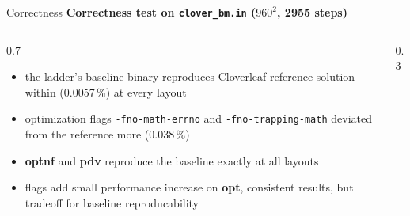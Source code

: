 \documentclass[aspectratio=169,10pt]{beamer}
\begin{document}
\begin{frame}{Correctness}
  \textbf{Correctness test on \texttt{clover\_bm.in} ($960^2$, 2955 steps)}
  \begin{columns}[T]
    \begin{column}{0.7\textwidth}
      \begin{itemize}
        \item the ladder's baseline binary reproduces Cloverleaf reference solution within (0.0057\,\%) at every layout
        \item optimization flags \texttt{-fno-math-errno} and \texttt{-fno-trapping-math} deviated from the reference more (0.038\,\%)
        \item \textbf{optnf} and \textbf{pdv} reproduce the baseline exactly at all layouts
        \item flags add small performance increase on \textbf{opt}, consistent results, but tradeoff for baseline reproducability
      \end{itemize}
    \end{column}
    \begin{column}{0.3\textwidth}
    \end{column}
  \end{columns}
\end{frame}

\end{document}

